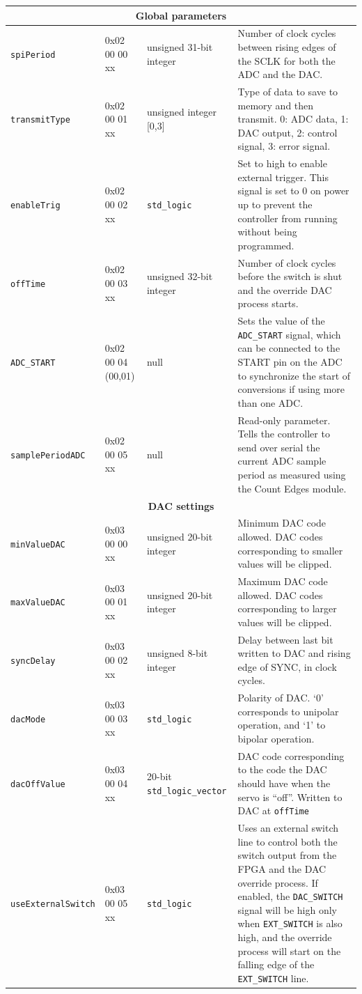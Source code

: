 \documentclass{article}
\begin{document}
\begin{longtable}[c]{|l|l|l|p{6cm}|}
	\multicolumn{4}{|c|}{\textbf{Global parameters}}\\
	\hline
	\verb|spiPeriod|		&0x02 00 00 xx				&unsigned 31-bit integer		&Number of clock cycles between rising edges of the SCLK for both the ADC and the DAC.\\\hline
	\verb|transmitType|		&0x02 00 01 xx				&unsigned integer [0,3]			&Type of data to save to memory and then transmit.  0: ADC data, 1: DAC output, 2: control signal, 3: error signal.\\\hline
	\verb|enableTrig|		&0x02 00 02 xx				&\verb|std_logic|				&Set to high to enable external trigger.  This signal is set to 0 on power up to prevent the controller from running without being programmed.\\\hline
	\verb|offTime|			&0x02 00 03 xx				&unsigned 32-bit integer		&Number of clock cycles before the switch is shut and the override DAC process starts.\\\hline
	\verb|ADC_START|		&0x02 00 04 (00,01)			&null							&Sets the value of the \verb|ADC_START| signal, which can be connected to the START pin on the ADC to synchronize the start of conversions if using more than one ADC.\\\hline
	\verb|samplePeriodADC|	&0x02 00 05 xx				&null							&Read-only parameter.  Tells the controller to send over serial the current ADC sample period as measured using the Count Edges module.\\\hline
	
	\multicolumn{4}{|c|}{\textbf{DAC settings}}\\
	\hline
	\verb|minValueDAC|		&0x03 00 00 xx				&unsigned 20-bit integer		&Minimum DAC code allowed.  DAC codes corresponding to smaller values will be clipped.\\\hline
	\verb|maxValueDAC|		&0x03 00 01 xx				&unsigned 20-bit integer		&Maximum DAC code allowed.  DAC codes corresponding to larger values will be clipped.\\\hline
	\verb|syncDelay|		&0x03 00 02 xx				&unsigned 8-bit integer			&Delay between last bit written to DAC and rising edge of SYNC, in clock cycles.\\\hline
	\verb|dacMode|			&0x03 00 03 xx				&\verb|std_logic|				&Polarity of DAC.  `0' corresponds to unipolar operation, and `1' to bipolar operation.\\\hline
	\verb|dacOffValue|		&0x03 00 04 xx				&20-bit \verb|std_logic_vector|	&DAC code corresponding to the code the DAC should have when the servo is ``off''. Written to DAC at \verb|offTime|\\\hline
	\verb|useExternalSwitch|&0x03 00 05 xx				&\verb|std_logic|				&Uses an external switch line to control both the switch output from the FPGA and the DAC override process.  If enabled, the \verb|DAC_SWITCH| signal will be high only when \verb|EXT_SWITCH| is also high, and the override process will start on the falling edge of the \verb|EXT_SWITCH| line.\\\hline
	

\end{longtable}
\end{document}
